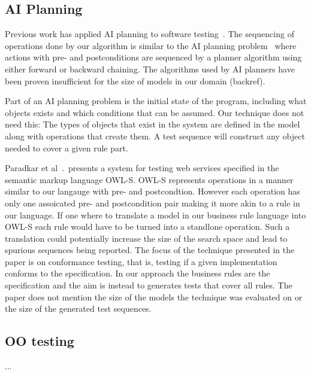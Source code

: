 \subsection{AI Planning}

Previous work has applied AI planning to software
testing~\cite{Scheetz99ai,Howe97testcase}. The sequencing of
operations done by our algorithm is similar to the AI planning
problem~\cite{Weld94} where actions with pre- and postconditions are sequenced
by a planner algorithm using either forward or backward chaining. The
algorithms used by AI planners have been proven insufficient for the
size of models in our domain (backref).

Part of an AI planning problem is the initial state of the program,
including what objects exists and which conditions that can be
assumed. Our technique does not need this: The types of objects that
exist in the system are defined in the model along with operations
that create them. A test sequence will construct any object needed to
cover a given rule part.

Paradkar et al~\cite{conf/icws/ParadkarSWJOSL07}.\ presents a system
for testing web services specified in the semantic markup language
OWL-S. OWL-S represents operations in a manner similar to our langauge
with pre- and postcondtion. However each operation has only one
assoicated pre- and postcondition pair making it more akin to a rule
in our language. If one where to translate a model in our business
rule language into OWL-S each rule would have to be turned into a
standlone operation. Such a translation could potentially increase the
size of the search space and lead to spurious sequences being
reported. The focus of the technique presented in the paper is on
conformance testing, that is, testing if a given implementation
conforms to the specification. In our approach the business rules are
the specification and the aim is instead to generates tests that cover
all rules. The paper does not mention the size of the models the
technique was evaluated on or the size of the generated test
sequences.

\subsection{OO testing}
 ...
